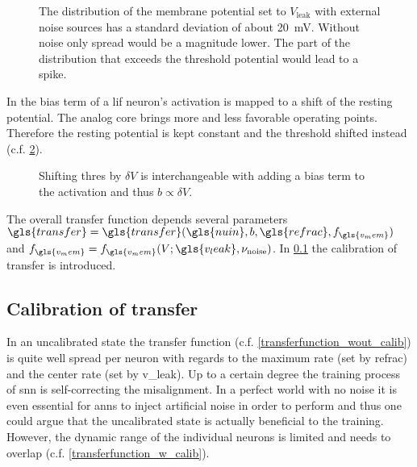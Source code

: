 \begin{figure}
	\label{vleak_w_noise}
	\begin{center}
		
	\end{center}
	\caption{The distribution of the membrane potential set to $V_{\text{leak}}$ with external noise sources has a standard deviation of about \SI{20}{\milli\V}. Without noise only spread would be a magnitude lower. The part of the distribution that exceeds the threshold potential would lead to a spike.}
\end{figure}

In \cite{petrovici2016stochastic} the bias term of a \gls{lif} neuron's activation is mapped to a shift of the resting potential. The analog core brings more and less favorable operating points. Therefore the resting potential is kept constant and the threshold shifted instead (c.f. \cref{transferfunction_with_bias}).

\begin{figure}
	\label{transferfunction_with_bias}
	\begin{center}
		
	\end{center}
	\caption{Shifting \gls{thres} by $\delta V$ is interchangeable with adding a bias term to the activation and thus $b \propto \delta V$.}
\end{figure}

The overall transfer function depends several parameters $\gls{transfer} = \gls{transfer}(\gls{nuin}, b, \gls{refrac}, f_{\gls{v_mem}})$ and $f_{\gls{v_mem}} = f_{\gls{v_mem}}(V; \gls{v_leak}, \nu_\text{noise})$. In \cref{calibration} the calibration of \gls{transfer} is introduced.

\subsection{Calibration of \gls{transfer}}\label{calibration}
In an uncalibrated state the transfer function (c.f. \cref{transferfunction_wout_calib}) is quite well spread per neuron with regards to the maximum rate (set by \gls{refrac}) and the center rate (set by \gls{v_leak}). Up to a certain degree the training process of \gls{snn} is self-correcting the misalignment. In a perfect world with no noise it is even essential for \glspl{ann} to inject artificial noise in order to perform and thus one could argue that the uncalibrated state is actually beneficial to the training. However, the dynamic range of the individual neurons is limited and needs to overlap (c.f. \cref{transferfunction_w_calib}).

